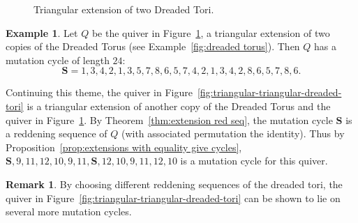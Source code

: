 \documentclass[11pt, letterpaper]{amsart}
\newcommand{\cS}[1]{{\noindent\textsf{\color{purple}$\blacksquare$~#1~$\blacksquare$}}}
\theoremstyle{definition}
\newtheorem{remark}[theorem]{Remark}
\newtheorem{example}[theorem]{Example}
\numberwithin{equation}{section}
\begin{document}
\begin{figure}[ht]
        \centering
        \caption{Triangular extension of two Dreaded Tori.}
        \label{fig:triangular-dreaded-tori}
    \end{figure}

\begin{example}
    Let $Q$ be the quiver in Figure~\ref{fig:triangular-dreaded-tori}, a triangular extension of two copies of the Dreaded Torus (see Example~\ref{fig:dreaded torus}).
    Then $Q$ has a mutation cycle of length $24$: 
    $$\mathbf S=1,3,4,2,1,3,5,7,8,6,5 ,7,4,2,1,3,4,2,8,6,5,7,8,6.$$
    

    Continuing this theme, the quiver in Figure~\ref{fig:triangular-triangular-dreaded-tori} is a triangular extension of another copy of the Dreaded Torus and the quiver in Figure~\ref{fig:triangular-dreaded-tori}.
    By Theorem~\ref{thm:extension red seq}, the mutation cycle $\mathbf S$ is a reddening sequence of $Q$ (with associated permutation the identity).
    Thus by Proposition~\ref{prop:extensions with equality give cycles}, $\mathbf S, 9,11,12,10,9,11, \mathbf S, 12,10,9,11,12,10$ is a mutation cycle for this quiver. 
\end{example}

\begin{remark}
    By choosing different reddening sequences of the dreaded tori, the quiver in Figure~\ref{fig:triangular-triangular-dreaded-tori} can be shown to lie on several more mutation cycles.
\end{remark}
\end{document}
